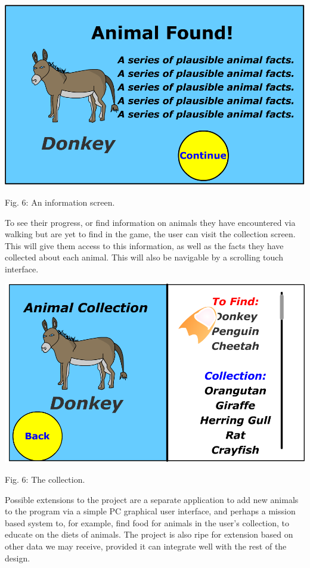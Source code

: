 \documentclass[]{article}
\begin{document}
\begin{center}
\includegraphics[scale=0.22]{animalfound.png}

Fig. 6: An information screen.
\end{center}

To see their progress, or find information on animals they have encountered via walking but are yet to find in the game, the user can visit the collection screen. This will give them access to this information, as well as the facts they have collected about each animal. This will also be navigable by a scrolling touch interface.

\begin{center}
\includegraphics[scale=0.22]{collection.png}

Fig. 6: The collection.
\end{center}

Possible extensions to the project are a separate application to add new animals to the program via a simple PC graphical user interface, and perhaps a mission based system to, for example, find food for animals in the user's collection, to educate on the diets of animals. The project is also ripe for extension based on other data we may receive, provided it can integrate well with the rest of the design.
\end{document}
